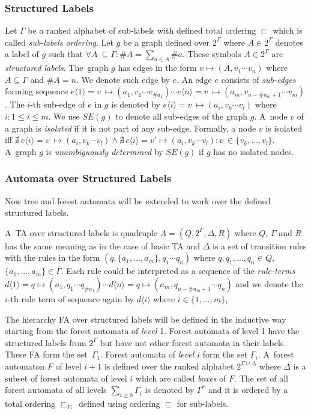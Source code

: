 \documentclass[a4paper, 12pt]{article}
\begin{document}
\subsubsection{Structured Labels}
\label{subsec:structlab}
Let $\Gamma$ be a ranked alphabet of sub-labels with defined total ordering $\sqsubset$ which is called \emph{sub-labels ordering}.
Let $g$ be a graph defined over $2^\Gamma$ where $A \in 2^\Gamma$ denotes a label of $g$
such that $\forall A~\subseteq \Gamma: \#A = \sum_{a\in A} \#a$.
These symbols $A \in 2^\Gamma$ are \emph{structured labels}.
The~graph $g$ has edges in the form $v \mapsto (A,v_1 \cdots v_n)$ where
$A \subseteq \Gamma$ and $\#A = n$.
We denote such edge by $e$.
An edge $e$ consists of \emph{sub-edges} forming sequence
$e\langle 1\rangle = v~\mapsto (a_1,v_1 \cdots v_{\#a_1}) \cdots e\langle n\rangle= v~\mapsto (a_m,v_{n-\#a_m+1} \cdots v_m)$.
The $i$-th sub-edge of $e$ in $g$ is denoted by $e\langle i\rangle = v~\mapsto (a_i,v_k \cdots v_l)$ where $i: 1 \leq i \leq m$.
We use $SE(g)$ to denote all sub-edges of the graph $g$.
A~node $v$ of a graph is \emph{isolated} if it is not part of any sub-edge.
Formally, a node $v$ is isolated
iff $\nexists\, e\langle i\rangle = v~\mapsto (a_i,v_k \cdots v_l) \wedge \nexists\, e\langle i\rangle = v' \mapsto (a_i,v_k \cdots v_l): v~\in \{v_k,\ldots, v_l\}$.
A~graph $g$ is \emph{unambiguously determined} by $SE(g)$ if $g$ has no isolated nodes.

\subsubsection{Automata over Structured Labels}
\label{subsec:hfa}

Now tree and forest automata will be extended to work over the defined structured labels.

A~TA over structured labels is quadruple $A=(Q,2^\Gamma, \Delta, R)$
where $Q$, $\Gamma$ and $R$ has the same meaning as in the case of basic TA and
	$\Delta$ is a set of transition rules with the rules in the form
		$(q,\{a_1,\ldots,a_m\},q_1 \cdots q_n)$
		where $q,q_1,\ldots,q_n \in Q$, $\{a_1,\ldots,a_m\} \in \Gamma$.
	Each rule could be interpreted as a sequence of the \emph{rule-terms}
	$d\langle 1\rangle = q \mapsto (a_1,q_1 \cdots q_{\#a_1}) \cdots d\langle n\rangle= q \mapsto (a_m,q_{n-\#a_m+1} \cdots q_n)$ and
	we denote the $i$-th rule term of sequence again by $d\langle i\rangle$ where $i \in \{1,\ldots,m\}$,

The hierarchy FA over structured labels will be defined in the inductive way
starting from the forest automata of \emph{level} 1.
Forest automata of level 1 have the structured labels from $2^\Gamma$ but
have not other forest automata in their labels.
These FA form the set~$\Gamma_1$.
Forest automata of \emph{level $i$} form the set $\Gamma_i$.
A~forest automaton $F$ of level $i+1$ is defined over the ranked alphabet $2^{\Gamma \cup \Delta}$
where $\Delta$ is a subset of forest automata of level $i$ which are called \emph{boxes} of $F$.
The set of all forest automata of all levels $\sum_{i \geq 0} \Gamma_i$ is denoted by $\Gamma^{*}$ and
it is ordered by a total ordering $\sqsubset_{\Gamma_*}$ defined using ordering $\sqsubset$ for sub-labels.
\end{document}
